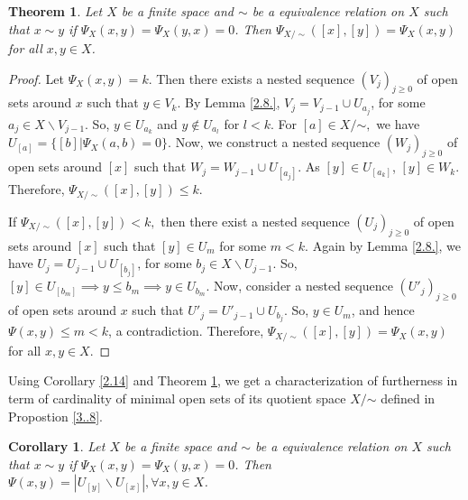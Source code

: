 \documentclass[12pt]{amsart}
\newtheorem{theorem}[definition]{Theorem}
\newtheorem{corollary}[definition]{Corollary}
\begin{document}
\begin{theorem}\label{3..9}
	Let $X$ be a finite space and $\sim$ be a equivalence relation on $X$ such that $x\sim y$ if $\Psi_X(x,y)=\Psi_X(y,x)=0$. Then $\Psi_{X/\sim}([x],[y])=\Psi_{X}(x,y)$ for all $x,y\in X$.
\end{theorem}

\begin{proof} Let $\Psi_X(x,y)=k$. Then there exists a nested sequence $(V_j)_{j\geq 0}$ of open sets around $x$ such that $y\in V_k$. By Lemma \ref{2.8.}, $V_j= V_{j-1}\cup U_{a_j}$, for some $a_j\in X\backslash V_{j-1}$. So, $y\in U_{a_k}$ and $y\notin U_{a_l}$ for $l<k$.
	For $[a]\in X/$$\sim,$ we have  $U_{[a]}=\{[b]|\Psi_X(a,b)=0\}$. Now, we construct a nested sequence $(W_j)_{j\geq0}$ of open sets around $[x]$ such that $W_{j} = W_{j-1}\cup U_{[a_{j}]}$. As $[y]\in U_{[a_k]}$, $[y]\in W_k$. Therefore, $\Psi_{X/\sim}([x],[y])\leq k.$\par 
	If $\Psi_{X/\sim}([x],[y])< k,$ then there exist a nested sequence $(U_j)_{j\geq0}$ of open sets around $[x]$ such that $[y]\in U_m$ for some $m<k$. Again by Lemma \ref{2.8.}, we have $U_j= U_{j-1}\cup U_{[b_j]}$, for some $b_j\in X\backslash U_{j-1}$. So, $[y]\in U_{[b_m]} \implies y\leq b_m \implies y\in U_{b_m}$. Now, consider a nested sequence $(U'_j)_{j\geq0}$ of open sets around $x$ such that $U'_j= U'_{j-1}\cup U_{b_j}$. So, $y\in U_m$, and hence $\Psi(x,y)\leq m<k$, a contradiction. Therefore, $\Psi_{X/\sim}([x],[y])=\Psi_{X}(x,y)$ for all $x,y\in X$.
\end{proof}

Using  Corollary \ref{2.14} and Theorem \ref{3..9}, we get a characterization of furtherness in term of cardinality of minimal open sets of its quotient space $X/$$\sim$ defined in Propostion \ref{3..8}.

\begin{corollary}
	Let $X$ be a finite space and $\sim$ be a equivalence relation on $X$ such that $x\sim y$ if $\Psi_X(x,y)=\Psi_X(y,x)=0$. Then $\Psi(x,y)= |U_{[y]}\backslash U_{[x]}|,\forall x,y\in X$.
\end{corollary}
\end{document}
